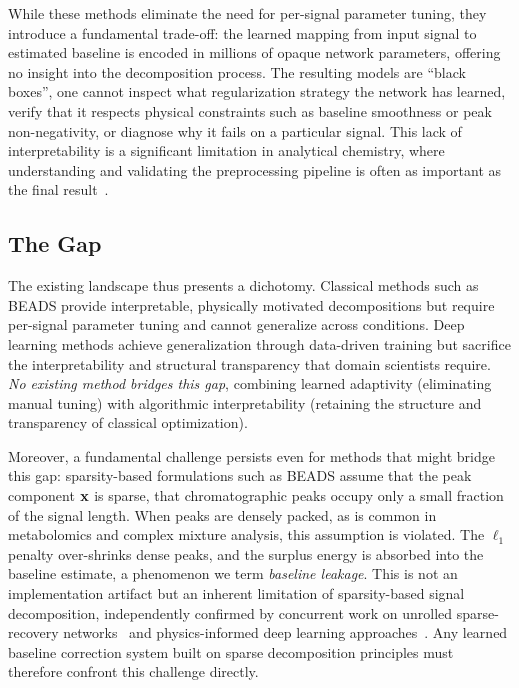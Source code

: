 While these methods eliminate the need for per-signal parameter tuning, they introduce a fundamental trade-off: the learned mapping from input signal to estimated baseline is encoded in millions of opaque network parameters, offering no insight into the decomposition process. The resulting models are ``black boxes'', one cannot inspect what regularization strategy the network has learned, verify that it respects physical constraints such as baseline smoothness or peak non-negativity, or diagnose why it fails on a particular signal. This lack of interpretability is a significant limitation in analytical chemistry, where understanding and validating the preprocessing pipeline is often as important as the final result~\cite{gharbi2024unrolled, diras2025}.

\subsection{The Gap}
\label{sec:intro_gap}

The existing landscape thus presents a dichotomy. Classical methods such as BEADS provide interpretable, physically motivated decompositions but require per-signal parameter tuning and cannot generalize across conditions. Deep learning methods achieve generalization through data-driven training but sacrifice the interpretability and structural transparency that domain scientists require. \emph{No existing method bridges this gap}, combining learned adaptivity (eliminating manual tuning) with algorithmic interpretability (retaining the structure and transparency of classical optimization).

Moreover, a fundamental challenge persists even for methods that might bridge this gap: sparsity-based formulations such as BEADS assume that the peak component $\mathbf{x}$ is sparse, that chromatographic peaks occupy only a small fraction of the signal length. When peaks are densely packed, as is common in metabolomics and complex mixture analysis, this assumption is violated. The $\ell_1$ penalty over-shrinks dense peaks, and the surplus energy is absorbed into the baseline estimate, a phenomenon we term \emph{baseline leakage}. This is not an implementation artifact but an inherent limitation of sparsity-based signal decomposition, independently confirmed by concurrent work on unrolled sparse-recovery networks~\cite{gharbi2024unrolled} and physics-informed deep learning approaches~\cite{diras2025}. Any learned baseline correction system built on sparse decomposition principles must therefore confront this challenge directly.

